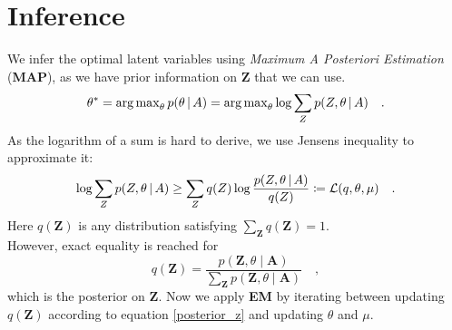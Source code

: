\section{Inference}


We infer the optimal latent variables using \textit{Maximum A Posteriori Estimation} (\textbf{MAP}), 
as we have prior information on \textbf{Z} that we can use. 
\begin{equation}
     \theta^* = \operatorname{arg\,max}_{\theta} p(\theta \,|\, A) = \operatorname{arg\,max}_{\theta} \log \sum_Z p(Z,\theta \,|\, A)\quad.
\end{equation}
As the logarithm of a sum is hard to derive, we use Jensens inequality to approximate it: 
\begin{equation} \label{loss_function}
    \begin{aligned} 
        \log \sum_Z p(Z,\theta \,|\, A) \geq \sum_Z q(Z) \log \frac{p(Z,\theta \,|\, A)}{q(Z)}\coloneqq \mathcal{L}(q, \theta, \mu) \quad.
    \end{aligned}
\end{equation}
Here $q(\textbf{Z})$ is any distribution satisfying $\sum_{\textbf{Z}} q(\textbf{Z}) = 1$. \\
However, exact equality is reached for 
\begin{equation} \label{posterior_z}
    q(\textbf{Z}) = \frac{p(\textbf{Z}, \theta \mid \textbf{A})}{\sum_{\textbf{Z}}p(\textbf{Z}, \theta \mid \textbf{A})}\quad,
\end{equation} 
which is the posterior on \textbf{Z}.
Now we apply \textbf{EM} by iterating between 
updating $q(\textbf{Z})$ according to equation \ref{posterior_z} and updating $\theta$ and $\mu$. 
\begin{comment}
The lossfunction (\ref{loss_function}) consist of a sum, where each summand depends only on certain parts of the whole set of parameters.
If we assume a uniform prior on $\theta$, we can rewrite it in the following way: 
\be
    \begin{aligned}
        \lossfunction &= \sum_Z q(Z) \log \frac{p(Z,\theta \mid A)}{q(Z)}   \\
                      & = \sum_{Z} q(Z) \log \left( \frac{1}{q(Z)} \right) \hspace{2cm}                    \text{\textcolor{gray}{Entropy of Q}}                           \\
                      & \hspace{.5cm} + \sum_{Z} q(Z) \log p(Z) \hspace{2.3cm}                \text{\textcolor{gray}{constant w.r.t. $\theta$}}               \\ 
                      & \hspace{.5cm} + \sum_{Z} q(Z) \log p(A \mid Z, \theta) \hspace{1.4cm} \text{\textcolor{gray}{constant w.r.t. $\mu$}}\quad.
    \end{aligned}
\ee
\end{comment}

